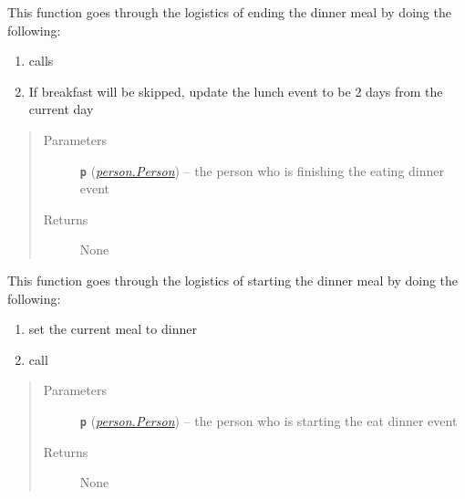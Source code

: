 \documentclass[letterpaper,10pt,english]{sphinxmanual}
\begin{document}
\begin{fulllineitems}
\begin{fulllineitems}
\end{fulllineitems}


\begin{fulllineitems}
\label{eat:eat.Eat_Dinner.end_meal}
This function goes through the logistics of ending the dinner meal by doing the following:
\begin{enumerate}
\item {} 
calls 

\item {} 
If breakfast will be skipped, update the lunch event to be 2 days from the current day

\end{enumerate}
\begin{quote}\begin{description}
\item[{Parameters}] \leavevmode
\textbf{\texttt{p}} ({\hyperref[person:person.Person]{\emph{\emph{person.Person}}}}) -- the person who is finishing the eating dinner event

\item[{Returns}] \leavevmode
None

\end{description}\end{quote}

\end{fulllineitems}


\begin{fulllineitems}
\label{eat:eat.Eat_Dinner.start_meal}
This function goes through the logistics of starting the dinner meal by doing the following:
\begin{enumerate}
\item {} 
set the current meal to dinner

\item {} 
call 

\end{enumerate}
\begin{quote}\begin{description}
\item[{Parameters}] \leavevmode
\textbf{\texttt{p}} ({\hyperref[person:person.Person]{\emph{\emph{person.Person}}}}) -- the person who is starting the eat dinner event

\item[{Returns}] \leavevmode
None

\end{description}\end{quote}

\end{fulllineitems}


\end{fulllineitems}
\end{document}
